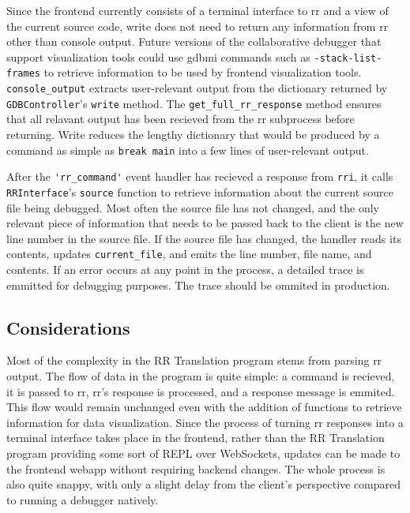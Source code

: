 \documentclass[12pt]{article}
\begin{document}
Since the frontend currently consists of a terminal interface to rr
and a view of the current source code, write does not need to return
any information from rr other than console output.  Future versions of
the collaborative debugger that support visualization tools could use
gdbmi commands such as \lstinline{-stack-list-frames} to retrieve
information to be used by frontend visualization tools.
\lstinline{console_output} extracts user-relevant output from the
dictionary returned by \lstinline{GDBController}'s \lstinline{write}
method.  The \lstinline{get_full_rr_response} method ensures that all
relavant output has been recieved from the rr subprocess before
returning.  Write reduces the lengthy dictionary that would be
produced by a command as simple as \lstinline{break main} into a few
lines of user-relevant output.
\par

After the \lstinline{'rr_command'} event handler has recieved a
response from \lstinline{rri}, it calls \lstinline{RRInterface}'s
\lstinline{source} function to retrieve information about the current
source file being debugged.  Most often the source file has not
changed, and the only relevant piece of information that needs to be
passed back to the client is the new line number in the source file.
If the source file has changed, the handler reads its contents,
updates \lstinline{current_file}, and emits the line number, file
name, and contents.  If an error occurs at any point in the process, a
detailed trace is emmitted for debugging purposes.  The trace should
be ommited in production.
\par

\subsection{Considerations}

Most of the complexity in the RR Translation program stems from
parsing rr output.  The flow of data in the program is quite simple: a
command is recieved, it is passed to rr, rr's response is processed,
and a response message is emmited.  This flow would remain unchanged
even with the addition of functions to retrieve information for data
visualization.  Since the process of turning rr responses into a
terminal interface takes place in the frontend, rather than the RR
Translation program providing some sort of REPL over WebSockets,
updates can be made to the frontend webapp without requiring backend
changes.  The whole process is also quite snappy, with only a slight
delay from the client's perspective compared to running a debugger
natively.
\par
\end{document}
